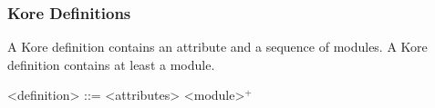\documentclass[UTF8,11pt]{article}
\theoremstyle{plain}
\theoremstyle{definition}
\theoremstyle{remark}
\newcommand{\Nat}{\textit{Nat}}
\newcommand{\List}{\textit{List}}
\newcommand{\Map}{\textit{Map}}
\newcommand{\parametric}[2]{{#1}\raisebox{.2ex}{\texttt{\footnotesize{\{}}}#2\raisebox{.2ex}{\texttt{\footnotesize{\}}}}}
\begin{document}
\subsubsection{Kore Definitions}

A Kore definition contains an attribute and a sequence of modules.
A Kore definition contains at least a module.

\begin{grammar}\small
<definition> ::= <attributes> <module>$^+$
\end{grammar}

%
%
%
%
%
%
%
%
%
%
\end{document}

